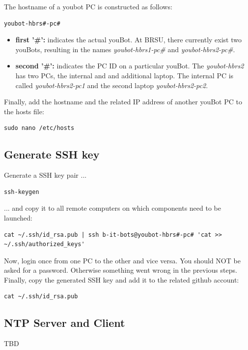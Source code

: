 \documentclass[a4paper,12pt]{article}
\begin{document}
The hostname of a youbot PC is constructed as follows:
\begin{lstlisting}
youbot-hbrs#-pc#
\end{lstlisting}

\begin{itemize}
	\item \textbf{first '\#':} indicates the actual youBot. At BRSU, there currently exist two youBots, resulting in the names \textit{youbot-hbrs1-pc\#} and \textit{youbot-hbrs2-pc\#}.
	\item \textbf{second '\#':} indicates the PC ID on a particular youBot. The \textit{youbot-hbrs2} has two PCs, the internal and and additional laptop. The internal PC is called \textit{youbot-hbrs2-pc1} and the second laptop \textit{youbot-hbrs2-pc2}.
\end{itemize}

Finally, add the hostname and the related IP address of another youBot PC to the hosts file:
\begin{lstlisting}
sudo nano /etc/hosts
\end{lstlisting}

\subsection{Generate SSH key}
Generate a SSH key pair ...
\begin{lstlisting}
ssh-keygen
\end{lstlisting}

... and copy it to all remote computers on which components need to be launched:
\begin{lstlisting}
cat ~/.ssh/id_rsa.pub | ssh b-it-bots@youbot-hbrs#-pc# 'cat >> ~/.ssh/authorized_keys'
\end{lstlisting}

Now, login once from one PC to the other and vice versa. You should NOT be asked for a password. Otherwise something went wrong in the previous steps.\\

Finally, copy the generated SSH key and add it to the related github account:
\begin{lstlisting}
cat ~/.ssh/id_rsa.pub
\end{lstlisting}

\subsection{NTP Server and Client}
TBD
\end{document}

